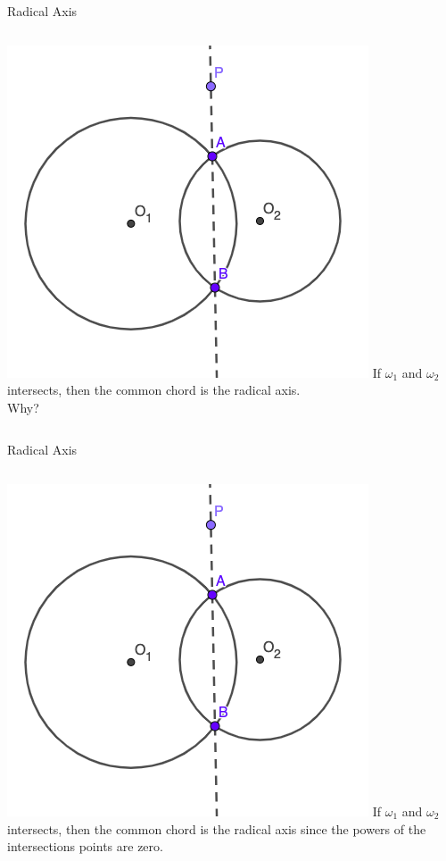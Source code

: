 \documentclass{beamer}
\begin{document}
\begin{frame}{Radical Axis}
	\begin{columns}
		\includegraphics[scale=0.4]{rad1.png}
		If $\omega_1$ and $\omega_2$ intersects, then 
		the common chord is the radical axis.\\
		\phantom{Spacing}
		Why?
	\end{columns}
\end{frame}
\begin{frame}{Radical Axis}
	\begin{columns}
		\column{0.6\textwidth}
		\includegraphics[scale=0.4]{rad1.png}
		\column{0.4\textwidth}
		If $\omega_1$ and $\omega_2$ intersects, then 
		the common chord is the radical axis since
		the powers of the intersections points are zero.
	\end{columns}
\end{frame}
\end{document}
